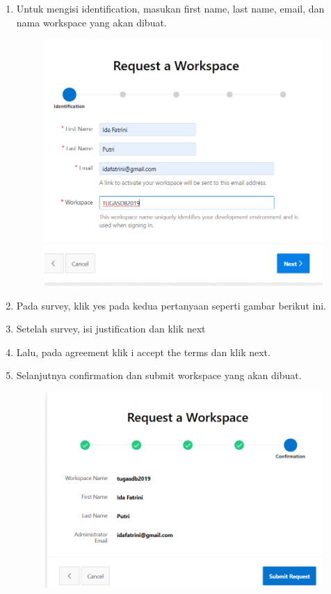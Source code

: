 \begin{enumerate}
    \item Untuk mengisi identification, masukan first name, last name, email, dan nama workspace yang akan dibuat.
    
\begin{figure}[!htbp]
    \centering
    \includegraphics[scale=0.5]{gambar/identi.png}
    \label{penanda}
\end{figure}

    \item Pada survey, klik yes pada kedua pertanyaan seperti gambar berikut ini.
    \item Setelah survey, isi justification dan klik next
    \item Lalu, pada agreement klik i accept the terms dan klik next.
    \item Selanjutnya confirmation dan submit workspace yang akan dibuat.
    
\begin{figure}[!htbp]
    \centering
    \includegraphics[scale=0.5]{gambar/confir.png}
    \label{penanda}
\end{figure}

\end{enumerate}

